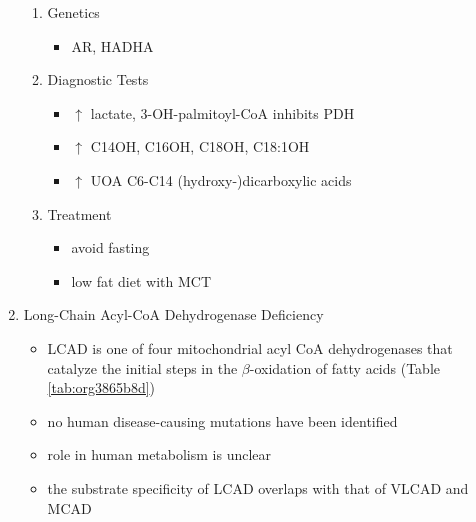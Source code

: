 \documentclass{scrartcl}
\begin{document}
\begin{enumerate}
\begin{enumerate}
\item Genetics
\label{sec:orgcc76ab5}
\begin{itemize}
\item AR, HADHA
\end{itemize}

\item Diagnostic Tests
\label{sec:org92ddc75}
\begin{itemize}
\item \(\uparrow\) lactate, 3-OH-palmitoyl-CoA inhibits PDH
\item \(\uparrow\) C14OH, C16OH, C18OH, C18:1OH
\item \(\uparrow\) UOA C6-C14 (hydroxy-)dicarboxylic acids
\end{itemize}

\item Treatment
\label{sec:org401b17f}
\begin{itemize}
\item avoid fasting
\item low fat diet with MCT
\end{itemize}
\end{enumerate}
\item Long-Chain Acyl-CoA Dehydrogenase Deficiency
\label{sec:orgb05f9d6}
\begin{itemize}
\item LCAD is one of four mitochondrial acyl CoA dehydrogenases that
catalyze the initial steps in the \(\beta\)-oxidation of fatty acids
(Table \ref{tab:org3865b8d})
\item no human disease-causing mutations have been identified
\item role  in  human  metabolism  is unclear
\item the substrate specificity of LCAD overlaps with that of
VLCAD and MCAD
\end{itemize}


\end{enumerate}
\end{document}
